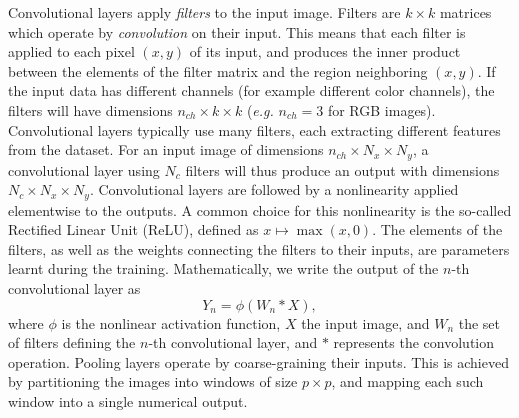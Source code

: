 \documentclass[
    floatfix, aps, pra, superscriptaddress,
	10pt, twocolumn,
    nofootinbib,
	tightenlines
]{revtex4-1}
\newcommand{\rmv}[1]{{\color{red}\st{#1}}}
\begin{document}
Convolutional layers apply \textit{filters} to the input image. Filters are $k\times k$ matrices which operate by \textit{convolution} on their input. This means that each filter is applied to each pixel $(x, y)$ of its input, and produces the inner product between the elements of the filter matrix and the region neighboring $(x, y)$.
If the input data has different channels (for example different color channels), the filters will have dimensions $n_{ch}\times k\times k$ (\textit{e.g.} $n_{ch}=3$ for RGB images).
Convolutional layers typically use many filters, each extracting different features from the dataset.
For an input image of dimensions $n_{ch}\times N_x\times N_y$, a convolutional layer using $N_c$ filters will thus produce an output with dimensions $N_c\times N_x\times N_y$.
Convolutional layers are followed by a nonlinearity applied elementwise to the outputs.
A common choice for this nonlinearity is the so-called Rectified Linear Unit (ReLU), defined as $x\mapsto\max(x,0)$.
The elements of the filters, as well as the weights connecting the filters to their inputs, are parameters learnt during the training.
Mathematically, we write the output of the $n$-th convolutional layer as
\begin{equation}
    Y_n = \phi(W_n * X),
    \label{eq:ml_conv}
\end{equation}
where $\phi$ is the nonlinear activation function, $X$ the input image, and $W_n$ the set of filters defining the $n$-th convolutional layer, and $*$ represents the convolution operation.
Pooling layers operate by coarse-graining their inputs.
This is achieved by partitioning the images into windows of size $p\times p$, and mapping each such window into a single numerical output.
\end{document}
